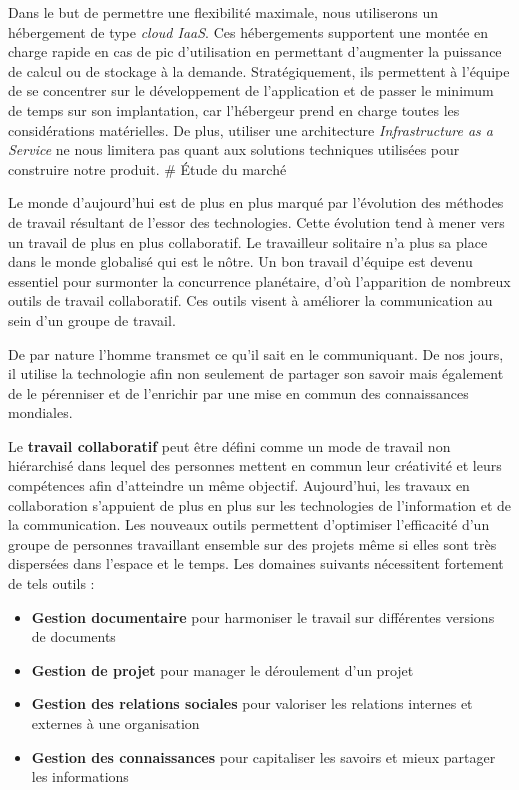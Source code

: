 \documentclass[10pt,twocolumn,a4paper,utf8x]{article}
\begin{document}
Dans le but de permettre une flexibilité maximale, nous utiliserons un
hébergement de type \emph{cloud IaaS}. Ces hébergements supportent une
montée en charge rapide en cas de pic d'utilisation en permettant
d'augmenter la puissance de calcul ou de stockage à la demande.
Stratégiquement, ils permettent à l'équipe de se concentrer sur le
développement de l'application et de passer le minimum de temps sur son
implantation, car l'hébergeur prend en charge toutes les considérations
matérielles. De plus, utiliser une architecture \emph{Infrastructure as
a Service} ne nous limitera pas quant aux solutions techniques utilisées
pour construire notre produit. \# Étude du marché

Le monde d'aujourd'hui est de plus en plus marqué par l'évolution des
méthodes de travail résultant de l'essor des technologies. Cette
évolution tend à mener vers un travail de plus en plus collaboratif. Le
travailleur solitaire n'a plus sa place dans le monde globalisé qui est
le nôtre. Un bon travail d'équipe est devenu essentiel pour surmonter la
concurrence planétaire, d'où l'apparition de nombreux outils de travail
collaboratif. Ces outils visent à améliorer la communication au sein
d'un groupe de travail.

De par nature l'homme transmet ce qu'il sait en le communiquant. De nos
jours, il utilise la technologie afin non seulement de partager son
savoir mais également de le pérenniser et de l'enrichir par une mise en
commun des connaissances mondiales.

Le \textbf{travail collaboratif} peut être défini comme un mode de
travail non hiérarchisé dans lequel des personnes mettent en commun leur
créativité et leurs compétences afin d'atteindre un même objectif.
Aujourd'hui, les travaux en collaboration s'appuient de plus en plus sur
les technologies de l'information et de la communication. Les nouveaux
outils permettent d'optimiser l'efficacité d'un groupe de personnes
travaillant ensemble sur des projets même si elles sont très dispersées
dans l'espace et le temps. Les domaines suivants nécessitent fortement
de tels outils :

\begin{itemize}
\itemsep1pt\parskip0pt
\item
  \textbf{Gestion documentaire} pour harmoniser le travail sur
  différentes versions de documents
\item
  \textbf{Gestion de projet} pour manager le déroulement d'un projet
\item
  \textbf{Gestion des relations sociales} pour valoriser les relations
  internes et externes à une organisation
\item
  \textbf{Gestion des connaissances} pour capitaliser les savoirs et
  mieux partager les informations
\end{itemize}
\end{document}
